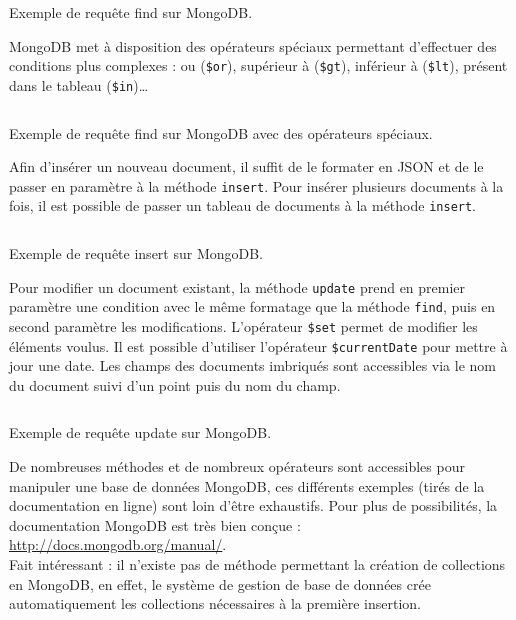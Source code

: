   \begin{listing}[H]
    \inputminted{JavaScript}{code/requeteMongoFind.js}
    \caption{Exemple de requête find sur MongoDB.}
  \end{listing}

  MongoDB met à disposition des opérateurs spéciaux permettant d'effectuer des conditions plus complexes : ou (\verb|$or|), supérieur à (\verb|$gt|), inférieur à (\verb|$lt|), présent dans le tableau (\verb|$in|)\dots

  \begin{listing}[H]
    \inputminted{JavaScript}{code/requeteMongoFindOperator.js}
    \caption{Exemple de requête find sur MongoDB avec des opérateurs spéciaux.}
  \end{listing}

  Afin d'insérer un nouveau document, il suffit de le formater en JSON et de le passer en paramètre à la méthode \verb|insert|. Pour insérer plusieurs documents à la fois, il est possible de passer un tableau de documents à la méthode \verb|insert|.

  \begin{listing}[H]
    \inputminted{JavaScript}{code/requeteMongoInsert.js}
    \caption{Exemple de requête insert sur MongoDB.}
  \end{listing}

  Pour modifier un document existant, la méthode \verb|update| prend en premier paramètre une condition avec le même formatage que la méthode \verb|find|, puis en second paramètre les modifications. L'opérateur \verb|$set| permet de modifier les éléments voulus. Il est possible d'utiliser l'opérateur \verb|$currentDate| pour mettre à jour une date. Les champs des documents imbriqués sont accessibles via le nom du document suivi d'un point puis du nom du champ. 

  \begin{listing}[H]
    \inputminted{JavaScript}{code/requeteMongoUpdate.js}
    \caption{Exemple de requête update sur MongoDB.}
  \end{listing}

  De nombreuses méthodes et de nombreux opérateurs sont accessibles pour manipuler une base de données MongoDB, ces différents exemples (tirés de la documentation en ligne) sont loin d'être exhaustifs. Pour plus de possibilités, la documentation MongoDB est très bien conçue : \url{http://docs.mongodb.org/manual/}.\\

  Fait intéressant : il n'existe pas de méthode permettant la création de collections en MongoDB, en effet, le système de gestion de base de données crée automatiquement les collections nécessaires à la première insertion.

